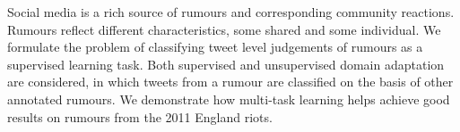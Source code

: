 Social media is a rich source of rumours and corresponding community reactions. Rumours reflect different characteristics, some shared and some individual.  We formulate the problem of classifying tweet level judgements of rumours as a supervised learning task. Both supervised and unsupervised domain adaptation are considered, in which tweets from a rumour are classified on the basis of other annotated rumours. We demonstrate how multi-task learning helps achieve good results on rumours from the 2011 England riots.
